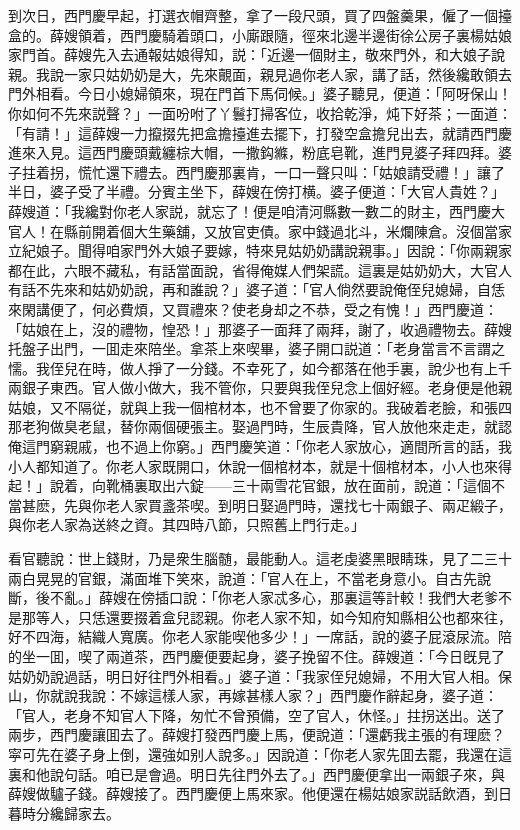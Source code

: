 到次日，西門慶早起，打選衣帽齊整，拿了一段尺頭，買了四盤羹果，僱了一個擡盒的。薛嫂領着，西門慶騎着頭口，小廝跟隨，徑來北邊半邊街徐公房子裏楊姑娘家門首。薛嫂先入去通報姑娘得知，説：「近邊一個財主，敬來門外，和大娘子說親。我說一家只姑奶奶是大，先來覿面，親見過你老人家，講了話，然後纔敢領去門外相看。今日小媳婦領來，現在門首下馬伺候。」婆子聽見，便道：「阿呀保山！你如何不先來説聲？」一面吩咐了丫鬟打掃客位，收拾乾淨，炖下好茶；一面道：「有請！」這薛嫂一力攛掇先把盒擔擡進去擺下，打發空盒擔兒出去，就請西門慶進來入見。這西門慶頭戴纏棕大帽，一撒鈎縧，粉底皂靴，進門見婆子拜四拜。婆子拄着拐，慌忙還下禮去。西門慶那裏肯，一口一聲只叫：「姑娘請受禮！」讓了半日，婆子受了半禮。分賓主坐下，薛嫂在傍打横。婆子便道：「大官人貴姓？」薛嫂道：「我纔對你老人家説，就忘了！便是咱清河縣數一數二的財主，西門慶大官人！在縣前開着個大生藥舖，又放官吏債。家中錢過北斗，米爛陳倉。沒個當家立紀娘子。聞得咱家門外大娘子要嫁，特來見姑奶奶講說親事。」因說：「你兩親家都在此，六眼不藏私，有話當面說，省得俺媒人們架謊。這裏是姑奶奶大，大官人有話不先來和姑奶奶說，再和誰說？」婆子道：「官人倘然要說俺侄兒媳婦，自恁來閑講便了，何必費煩，又買禮來？使老身却之不恭，受之有愧！」西門慶道：「姑娘在上，沒的禮物，惶恐！」那婆子一面拜了兩拜，謝了，收過禮物去。薛嫂托盤子出門，一囬走來陪坐。拿茶上來喫畢，婆子開口説道：「老身當言不言謂之懦。我侄兒在時，做人掙了一分錢。不幸死了，如今都落在他手裏，說少也有上千兩銀子東西。官人做小做大，我不管你，只要與我侄兒念上個好經。老身便是他親姑娘，又不隔従，就與上我一個棺材本，也不曾要了你家的。我破着老臉，和張四那老狗做臭老鼠，替你兩個硬張主。娶過門時，生辰貴降，官人放他來走走，就認俺這門窮親戚，也不過上你窮。」西門慶笑道：「你老人家放心，適間所言的話，我小人都知道了。你老人家既開口，休說一個棺材本，就是十個棺材本，小人也來得起！」說着，向靴桶裏取出六錠——三十兩雪花官銀，放在面前，說道：「這個不當甚麽，先與你老人家買盞茶喫。到明日娶過門時，還找七十兩銀子、兩疋緞子，與你老人家為送終之資。其四時八節，只照舊上門行走。」

看官聽說：世上錢財，乃是衆生腦髄，最能動人。這老虔婆黑眼睛珠，見了二三十兩白晃晃的官銀，滿面堆下笑來，說道：「官人在上，不當老身意小。自古先說斷，後不亂。」薛嫂在傍插口說：「你老人家忒多心，那裏這等計較！我們大老爹不是那等人，只恁還要掇着盒兒認親。你老人家不知，如今知府知縣相公也都來往，好不四海，結織人寬廣。你老人家能喫他多少！」一席話，說的婆子屁滾尿流。陪的坐一囬，喫了兩道茶，西門慶便要起身，婆子挽留不住。薛嫂道：「今日旣見了姑奶奶說過話，明日好往門外相看。」婆子道：「我家侄兒媳婦，不用大官人相。保山，你就說我說：不嫁這樣人家，再嫁甚樣人家？」西門慶作辭起身，婆子道：「官人，老身不知官人下降，匆忙不曾預備，空了官人，休怪。」拄拐送出。送了兩步，西門慶讓囬去了。薛嫂打發西門慶上馬，便說道：「還虧我主張的有理麽？寜可先在婆子身上倒，還強如别人說多。」因說道：「你老人家先囬去罷，我還在這裏和他說句話。咱已是會過。明日先往門外去了。」西門慶便拿出一兩銀子來，與薛嫂做驢子錢。薛嫂接了。西門慶便上馬來家。他便還在楊姑娘家説話飲酒，到日暮時分纔歸家去。

